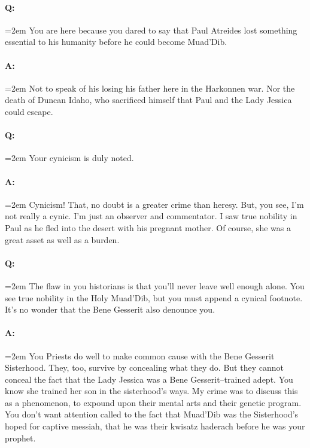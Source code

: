\documentclass[a4paper, 12pt, oldfontcommands, final]{memoir}
\begin{document}
\paragraph{Q:} \hangindent=2em You are here because you dared to say that Paul Atreides lost something essential to his humanity before he could become Muad'Dib.
\paragraph{A:} \hangindent=2em Not to speak of his losing his father here in the Harkonnen war. Nor the death of Duncan Idaho, who sacrificed himself that Paul and the Lady Jessica could escape.
\paragraph{Q:} \hangindent=2em Your cynicism is duly noted.
\paragraph{A:} \hangindent=2em Cynicism! That, no doubt is a greater crime than heresy. But, you see, I'm not really a cynic. I'm just an observer and commentator. I saw true nobility in Paul as he fled into the desert with his pregnant mother. Of course, she was a great asset as well as a burden.
\paragraph{Q:} \hangindent=2em The flaw in you historians is that you'll never leave well enough alone. You see true nobility in the Holy Muad'Dib, but you must append a cynical footnote. It's no wonder that the Bene Gesserit also denounce you.
\paragraph{A:} \hangindent=2em You Priests do well to make common cause with the Bene Gesserit Sisterhood. They, too, survive by concealing what they do. But they cannot conceal the fact that the Lady Jessica was a Bene Gesserit–trained adept. You know she trained her son in the sisterhood's ways. My crime was to discuss this as a phenomenon, to expound upon their mental arts and their genetic program. You don't want attention called to the fact that Muad'Dib was the Sisterhood's hoped for captive messiah, that he was their kwisatz haderach before he was your prophet.
\end{document}
